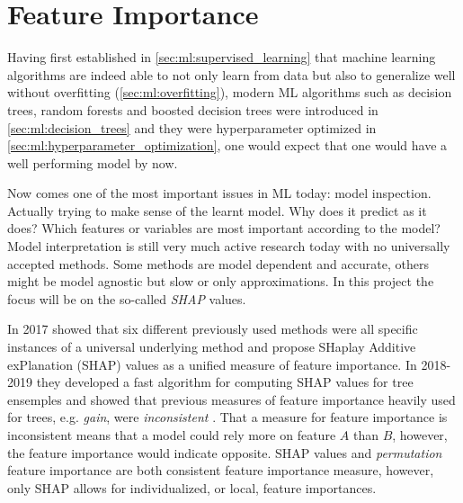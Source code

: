 \section{Feature Importance}
\label{sec:ml:feature_importance}
Having first established in \autoref{sec:ml:supervised_learning} that machine learning algorithms are indeed able to not only learn from data but also to generalize well without overfitting (\autoref{sec:ml:overfitting}), modern ML algorithms such as decision trees, random forests and boosted decision trees were introduced in \autoref{sec:ml:decision_trees} and they were hyperparameter optimized in \autoref{sec:ml:hyperparameter_optimization}, one would expect that one would have a well performing model by now. 

Now comes one of the most important issues in ML today: model inspection. Actually trying to make sense of the learnt model. Why does it predict as it does? Which features or variables are most important according to the model? Model interpretation is still very much active research today with no universally accepted methods. Some methods are model dependent and accurate, others might be model agnostic but slow or only approximations. In this project the focus will be on the so-called \emph{SHAP} values. 

In 2017 \citet{Lundberg:2017} showed that six different previously used methods were all specific instances of a universal underlying method and propose SHaplay Additive exPlanation (SHAP) values as a unified measure of feature importance. In 2018-2019 they developed a fast algorithm for computing SHAP values for tree ensemples and showed that previous measures of feature importance heavily used for trees, e.g. \emph{gain}, were \emph{inconsistent} \autocite{lundbergConsistentIndividualizedFeature2019}. That a measure for feature importance is inconsistent means that a model could rely more on feature $A$ than $B$, however, the feature importance would indicate opposite. SHAP values and \emph{permutation} feature importance are both consistent feature importance measure, however, only SHAP allows for individualized, or local, feature importances.  

